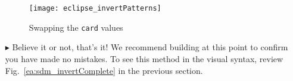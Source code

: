 \begin{itemize}
\vspace{0.5cm}

\begin{figure}[htbp]
\begin{center}
  \texttt{[image: eclipse\_invertPatterns]}
  \caption{Swapping the \texttt{card} values}  
  \label{eclipse:invertPatterns}
\end{center}
\end{figure}

\item[$\blacktriangleright$] Believe it or not, that's it! We recommend building at this point to confirm you have made no mistakes. To
see this method in the visual syntax, review Fig.~\ref{ea:sdm_invertComplete} in the previous section.

\end{itemize}
